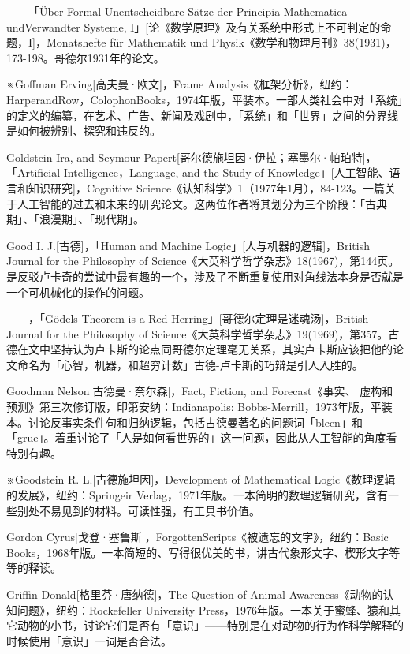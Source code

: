 \documentclass[
  12pt,
  twoside,
  openright,
  oldfontcommands,
]{memoir}
\begin{document}
------「Über Formal Unentscheidbare Sätze der Principia Mathematica
undVerwandter Systeme,
I」{[}论《数学原理》及有关系统中形式上不可判定的命题，I{]}，Monatshefte
für Mathematik und
Physik《数学和物理月刊》38(1931)，173-198。哥德尔1931年的论文。

※Goffman Erving{[}高夫曼·欧文{]}，Frame
Analysis《框架分析》，纽约：HarperandRow，ColophonBooks，1974年版，平装本。一部人类社会中对「系统」的定义的编纂，在艺术、广告、新闻及戏剧中，「系统」和「世界」之间的分界线是如何被辨别、探究和违反的。

Goldstein Ira, and Seymour
Papert{[}哥尔德施坦因·伊拉；塞墨尔·帕珀特{]}，「Artificial
Intelligence，Language, and the Study of
Knowledge」{[}人工智能、语言和知识研究{]}，Cognitive
Science《认知科学》1（1977年1月），84-123。一篇关于人工智能的过去和未来的研究论文。这两位作者将其划分为三个阶段：「古典期」、「浪漫期」、「现代期」。

Good I. J.{[}古德{]}，「Human and Machine
Logic」{[}人与机器的逻辑{]}，British Journal for the Philosophy of
Science《大英科学哲学杂志》18(1967)，第144页。是反驳卢卡奇的尝试中最有趣的一个，涉及了不断重复使用对角线法本身是否就是一个可机械化的操作的问题。

------，「Gödel\textquotesingle s Theorem is a Red
Herring」{[}哥德尔定理是迷魂汤{]}，British Journal for the Philosophy of
Science《大英科学哲学杂志》19(1969)，第357。古德在文中坚持认为卢卡斯的论点同哥德尔定理毫无关系，其实卢卡斯应该把他的论文命名为「心智，机器，和超穷计数」古德-卢卡斯的巧辩是引人入胜的。

Goodman Nelson{[}古德曼·奈尔森{]}，Fact, Fiction, and Forecast《事实、
虚构和预测》第三次修订版，印第安纳：Indianapolis:
Bobbs-Merrill，1973年版，平装本。讨论反事实条件句和归纳逻辑，包括古德曼著名的问题词「bleen」和「grue」。着重讨论了「人是如何看世界的」这一问题，因此从人工智能的角度看特别有趣。

※Goodstein R. L.{[}古德施坦因{]}，Development of Mathematical
Logic《数理逻辑的发展》，纽约：Springeir
Verlag，1971年版。一本简明的数理逻辑研究，含有一些别处不易见到的材料。可读性强，有工具书价值。

Gordon
Cyrus{[}戈登·塞鲁斯{]}，ForgottenScripts《被遗忘的文字》，纽约：Basic
Books，1968年版。一本简短的、写得很优美的书，讲古代象形文字、楔形文字等等的释读。

Griffin Donald{[}格里芬·唐纳德{]}，The Question of Animal
Awareness《动物的认知问题》，纽约：Rockefeller University
Press，1976年版。一本关于蜜蜂、猿和其它动物的小书，讨论它们是否有「意识」------特别是在对动物的行为作科学解释的时候使用「意识」一词是否合法。
\end{document}
